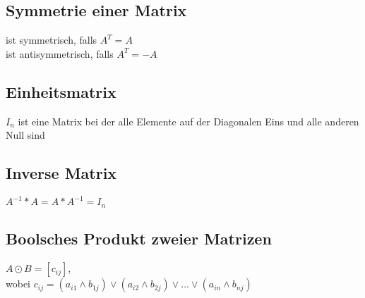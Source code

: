 \subsection{Symmetrie einer Matrix}
ist symmetrisch, falls $A^T = A$ \\
ist antisymmetrisch, falls $A^T = -A$

\subsection{Einheitsmatrix}
$I_n$ ist eine Matrix bei der alle Elemente auf der Diagonalen Eins und alle anderen Null sind

\subsection{Inverse Matrix}
$A^{-1} * A = A * A^{-1} = I_n$

\subsection{Boolsches Produkt zweier Matrizen}
$ A \odot B = [c_{ij}] $, \\
wobei $c_{ij} = (a_{i1} \land b_{1j}) \lor (a_{i2} \land b_{2j}) \lor \dots \lor (a_{in} \land b_{nj}) $

